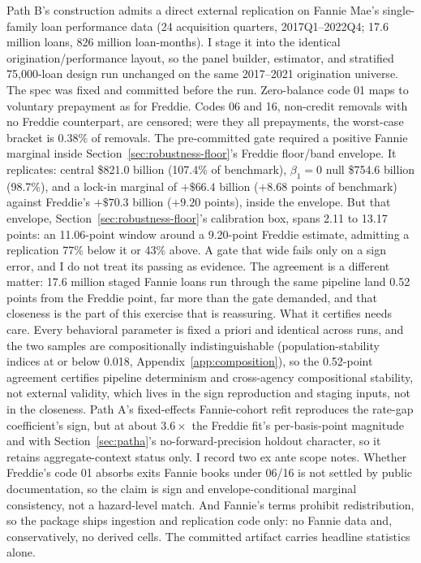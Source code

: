 \documentclass[12pt]{article}
\begin{document}
Path B's construction admits a direct external replication on Fannie Mae's single-family loan performance data (24 acquisition quarters, 2017Q1--2022Q4; 17.6 million loans, 826 million loan-months). I stage it into the identical origination/performance layout, so the panel builder, estimator, and stratified 75{,}000-loan design run unchanged on the same 2017--2021 origination universe. The spec was fixed and committed before the run. Zero-balance code 01 maps to voluntary prepayment as for Freddie. Codes 06 and 16, non-credit removals with no Freddie counterpart, are censored; were they all prepayments, the worst-case bracket is 0.38\% of removals. The pre-committed gate required a positive Fannie marginal inside Section~\ref{sec:robustness-floor}'s Freddie floor/band envelope. It replicates: central \$821.0 billion (107.4\% of benchmark), $\beta_1 = 0$ null \$754.6 billion (98.7\%), and a lock-in marginal of $+\$66.4$ billion ($+8.68$ points of benchmark) against Freddie's $+\$70.3$ billion ($+9.20$ points), inside the envelope. But that envelope, Section~\ref{sec:robustness-floor}'s calibration box, spans 2.11 to 13.17 points: an 11.06-point window around a 9.20-point Freddie estimate, admitting a replication 77\% below it or 43\% above. A gate that wide fails only on a sign error, and I do not treat its passing as evidence. The agreement is a different matter: 17.6 million staged Fannie loans run through the same pipeline land 0.52 points from the Freddie point, far more than the gate demanded, and that closeness is the part of this exercise that is reassuring. What it certifies needs care. Every behavioral parameter is fixed a priori and identical across runs, and the two samples are compositionally indistinguishable (population-stability indices at or below 0.018, Appendix~\ref{app:composition}), so the 0.52-point agreement certifies pipeline determinism and cross-agency compositional stability, not external validity, which lives in the sign reproduction and staging inputs, not in the closeness. Path A's fixed-effects Fannie-cohort refit reproduces the rate-gap coefficient's sign, but at about $3.6\times$ the Freddie fit's per-basis-point magnitude and with Section~\ref{sec:patha}'s no-forward-precision holdout character, so it retains aggregate-context status only. I record two ex ante scope notes. Whether Freddie's code 01 absorbs exits Fannie books under 06/16 is not settled by public documentation, so the claim is sign and envelope-conditional marginal consistency, not a hazard-level match. And Fannie's terms prohibit redistribution, so the package ships ingestion and replication code only: no Fannie data and, conservatively, no derived cells. The committed artifact carries headline statistics alone.
\end{document}

